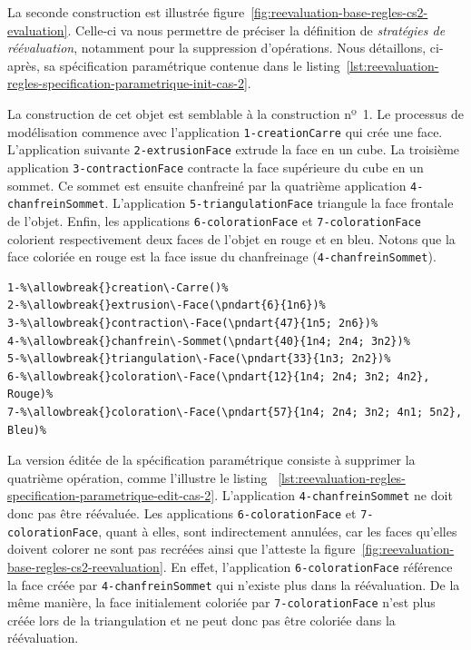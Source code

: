 La seconde construction est illustrée
figure~\ref{fig:reevaluation-base-regles-cs2-evaluation}. %
Celle-ci va nous permettre de préciser la définition de \textit{stratégies
	de réévaluation}, notamment pour la suppression d'opérations. %
Nous détaillons, ci-après, sa spécification paramétrique contenue dans le
listing~\ref{lst:reevaluation-regles-specification-parametrique-init-cas-2}. %

La construction de cet objet est semblable à la construction nº~1. %
Le processus de modélisation commence avec l'application \texttt{1-\allowbreak{}creation\-Carre}
qui crée une face. %
L'application suivante \texttt{2-\allowbreak{}extrusion\-Face} extrude la face en un cube. %
La troisième application \texttt{3-\allowbreak{}contraction\-Face} contracte la face supérieure du
cube en un sommet. %
Ce sommet est ensuite chanfreiné par la quatrième application
\texttt{4-\allowbreak{}chanfrein\-Sommet}. %
L'application \texttt{5-\allowbreak{}triangulation\-Face} triangule la face frontale de l'objet. %
Enfin, les applications \texttt{6-\allowbreak{}coloration\-Face} et \texttt{7-\allowbreak{}coloration\-Face} colorient respectivement
deux faces de l'objet en rouge et en bleu. %
Notons que la face coloriée en rouge est la face issue du chanfreinage
(\texttt{4-\allowbreak{}chanfrein\-Sommet}). %

\noindent
\begin{minipage}{\textwidth} %
\begin{lstlisting}[escapechar=\%,
style=script-style,
caption=Spécification paramétrique initiale du cas nº~2,
label=lst:reevaluation-regles-specification-parametrique-init-cas-2,
captionpos=b]
1-%\allowbreak{}creation\-Carre()%
2-%\allowbreak{}extrusion\-Face(\pndart{6}{1n6})%
3-%\allowbreak{}contraction\-Face(\pndart{47}{1n5; 2n6})%
4-%\allowbreak{}chanfrein\-Sommet(\pndart{40}{1n4; 2n4; 3n2})%
5-%\allowbreak{}triangulation\-Face(\pndart{33}{1n3; 2n2})%
6-%\allowbreak{}coloration\-Face(\pndart{12}{1n4; 2n4; 3n2; 4n2}, Rouge)%
7-%\allowbreak{}coloration\-Face(\pndart{57}{1n4; 2n4; 3n2; 4n1; 5n2}, Bleu)%
\end{lstlisting}
\end{minipage}
La version éditée de la spécification paramétrique consiste à supprimer la
quatrième opération, comme l'illustre le listing
~\ref{lst:reevaluation-regles-specification-parametrique-edit-cas-2}. %
L'application \texttt{4-\allowbreak{}chanfreinSommet} ne doit donc pas être réévaluée. %
Les applications \texttt{6-\allowbreak{}coloration\-Face} et
\texttt{7-\allowbreak{}coloration\-Face}, quant à elles, sont indirectement annulées, car les faces qu'elles doivent colorer ne sont pas recréées ainsi que l'atteste la
figure~\ref{fig:reevaluation-base-regles-cs2-reevaluation}.
En effet, l'application \texttt{6-coloration\-Face} référence la face créée par
\texttt{4-\allowbreak{}chanfrein\-Sommet} qui n'existe plus dans la réévaluation. %
De la même manière, la face initialement coloriée par \texttt{7-\allowbreak{}coloration\-Face}
n'est plus créée lors de la triangulation et ne peut donc pas être coloriée dans
la réévaluation. %

